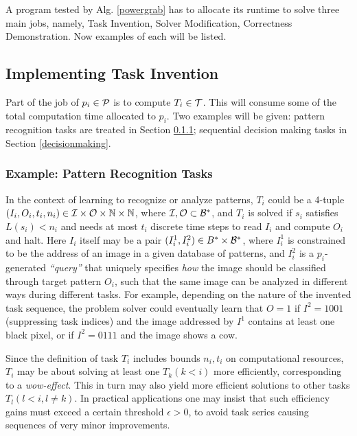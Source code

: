 \documentclass{article}
\begin{document}
A program tested by Alg. \ref{powergrab} has to allocate its runtime  to solve three main jobs, namely,
{\sc Task Invention},  {\sc Solver Modification},  {\sc Correctness Demonstration}.
Now examples of each will be listed.


\subsection{Implementing {\sc Task Invention}}
\label{taskinvention}

Part of the job of $p_i \in \cal P$ is to compute $T_i \in \cal T$. 
This will consume some of the total computation time allocated to $p_i$.
Two examples will be given:
pattern recognition tasks are treated in Section \ref{patternrecognition};
sequential decision making tasks in Section \ref{decisionmaking}.

\subsubsection{Example: Pattern Recognition Tasks} 
\label{patternrecognition}

In the context of  learning to recognize or analyze patterns,
$T_i$ could be a 4-tuple $(I_i, O_i, t_i, n_i) \in \cal I \times \cal O \times 
\mathbb{N} \times \mathbb{N} $, 
where  $\cal I, O \subset B^*$, and
$T_i$ is solved if $s_i$ satisfies $L(s_i)< n_i$ and
needs at most $t_i$ discrete time steps  to read $I_i$ and compute $O_i$ and halt.
Here $I_i$ itself may be a pair $(I^1_i, I^2_i) \in B^* \times \cal B^* $, where 
$I^1_i$ is constrained to be the address of an image in a given database of patterns,
and $I^2_i$ is a  $p_i$-generated {\em ``query''}
that uniquely specifies {\em how} the image 
should be classified through target pattern $O_i$,
such that the same image can be analyzed in different ways
during different tasks.
For example, depending on the nature of the invented task sequence,
the problem solver could eventually learn that $O=1$  if $I^2=1001$ (suppressing task indices)
and the image addressed by $I^1$ contains at least one black pixel, 
or   if $I^2=0111$ and the image shows a cow.

Since the definition of task $T_i$ includes bounds $n_i,t_i$ on computational resources,
$T_i$ may be about solving at least one $T_k (k<i)$ more efficiently,
corresponding to a {\em wow-effect}.
This in turn may also yield more efficient solutions to other tasks $T_l (l<i,l \neq k)$.
In practical applications one may insist that such efficiency gains must exceed a certain
threshold $\epsilon>0$, to avoid task series causing sequences of very minor improvements.
\end{document}
